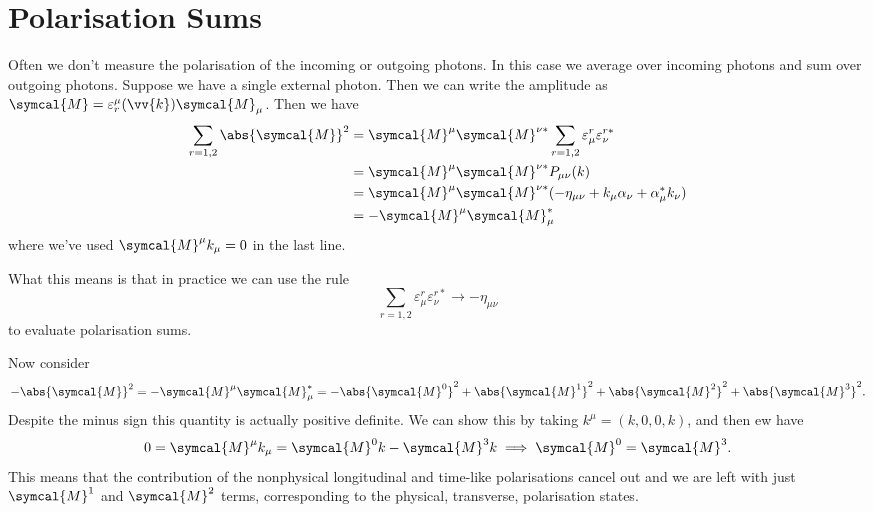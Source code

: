 \documentclass[fleqn]{NotesClass}
\newcommand{\minkowskiMetric}{\eta}
\newcommand{\amplitude}{\symcal{M}}
\begin{document}
    \section{Polarisation Sums}
    Often we don't measure the polarisation of the incoming or outgoing photons.
    In this case we average over incoming photons and sum over outgoing photons.
    Suppose we have a single external photon.
    Then we can write the amplitude as \(\amplitude = \varepsilon_r^\mu(\vv{k}) \amplitude_\mu\).
    Then we have
    \begin{align}
        \sum_{r=1,2} \abs{\amplitude}^2 &= \amplitude^\mu \amplitude^{\nu*} \sum_{r=1,2} \varepsilon_\mu^r \varepsilon_\nu^{r*}\\
        &= \amplitude^\mu\amplitude^{\nu*}P_{\mu\nu}(k)\\
        &= \amplitude^\mu\amplitude^{\nu*}(-\minkowskiMetric_{\mu\nu} + k_\mu\alpha_\nu + \alpha_\mu^*k_\nu)\\
        &= -\amplitude^\mu \amplitude_\mu^*
    \end{align}
    where we've used \(\amplitude^\mu k_\mu = 0\) in the last line.
    
    What this means is that in practice we can use the rule
    \begin{equation}
        \sum_{r=1,2} \varepsilon_\mu^r \varepsilon_\nu^{r*} \to -\minkowskiMetric_{\mu\nu}
    \end{equation}
    to evaluate polarisation sums.
    
    Now consider
    \begin{equation}
        -\abs{\amplitude}^2 = -\amplitude^\mu\amplitude_\mu^* = -\abs{\amplitude^0}^2 + \abs{\amplitude^1}^2 + \abs{\amplitude^2}^2 + \abs{\amplitude^3}^2.
    \end{equation}
    Despite the minus sign this quantity is actually positive definite.
    We can show this by taking \(k^\mu = (k, 0, 0, k)\), and then ew have
    \begin{equation}
        0 = \amplitude^\mu k_\mu = \amplitude^0k - \amplitude^3 k \implies \amplitude^0 = \amplitude^3.
    \end{equation}
    This means that the contribution of the nonphysical longitudinal and time-like polarisations cancel out and we are left with just \(\amplitude^1\) and \(\amplitude^2\) terms, corresponding to the physical, transverse, polarisation states.
    
\end{document}

